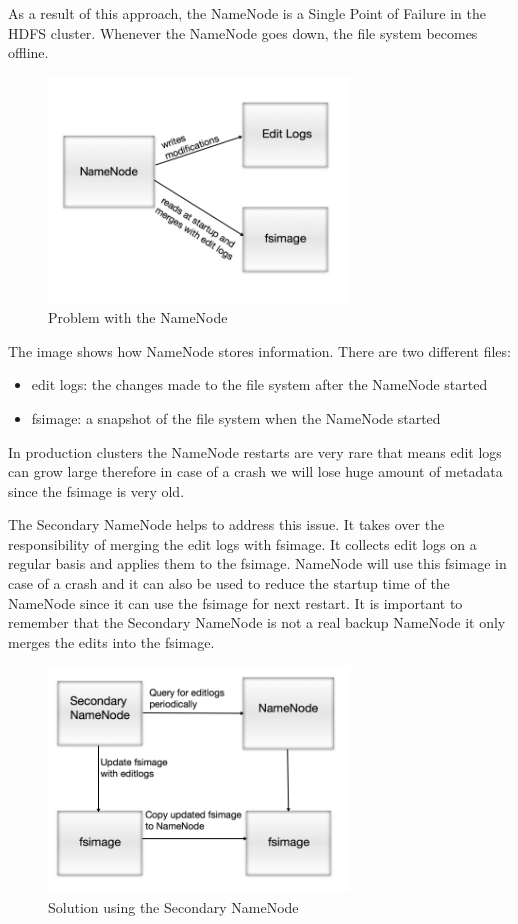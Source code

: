 As a result of this approach, the NameNode is a Single Point of Failure in the HDFS cluster. Whenever the NameNode goes down, the file system becomes offline.
\begin{figure}[H]
	\includegraphics[width=80mm, keepaspectratio]{figures/namenode_problem.png}
	\centering
	\caption*{Problem with the NameNode}
\end{figure}
The image shows how NameNode stores information. There are two different files:
\begin{itemize}
	\item edit logs: the changes made to the file system after the NameNode started
	\item fsimage: a snapshot of the file system when the NameNode started
\end{itemize}
In production clusters the NameNode restarts are very rare that means edit logs can grow large therefore in case of a crash we will lose huge amount of metadata since the fsimage is very old.

The Secondary NameNode helps to address this issue. It takes over the responsibility of merging the edit logs with fsimage. It collects edit logs on a regular basis and applies them to the fsimage. NameNode will use this fsimage in case of a crash and it can also be used to reduce the startup time of the NameNode since it can use the fsimage for next restart.
It is important to remember that the Secondary NameNode is not a real backup NameNode it only merges the edits into the fsimage. 

\begin{figure}[H]
	\includegraphics[width=80mm, keepaspectratio]{figures/secondary_namenode.png}
	\centering
	\caption*{Solution using the Secondary NameNode}
\end{figure}

